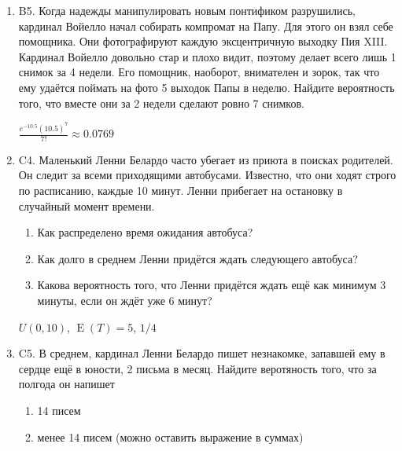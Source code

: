 \documentclass[12pt]{article}
\DeclareMathOperator{\E}{E}
\newenvironment{problem}{}{}
\newenvironment{sol}{}{} %
\begin{document}
\begin{enumerate}

\begin{problem}
\item[B5.] Когда надежды манипулировать новым понтификом разрушились, кардинал Войелло начал собирать компромат на Папу. Для этого он взял себе помощника. Они фотографируют каждую эксцентричную выходку Пия XIII. Кардинал Войелло довольно стар и плохо видит, поэтому делает всего лишь 1 снимок за 4 недели. Его помощник, наоборот, внимателен и зорок, так что ему удаётся поймать на фото 5 выходок Папы в неделю. Найдите вероятность того, что вместе они за 2 недели сделают ровно 7 снимков. 

\begin{sol}
$\frac{e^{-10.5}(10.5)^7}{7!} \approx 0.0769$
\end{sol}
\end{problem}

\begin{problem}
\item[C4.] Маленький Ленни Белардо часто убегает из приюта в поисках родителей. Он следит за всеми приходящими автобусами. Известно, что они ходят строго по расписанию, каждые 10 минут. Ленни прибегает на остановку в случайный момент времени.

\begin{enumerate}
\item Как распределено время ожидания автобуса?
\item Как долго в среднем Ленни придётся ждать следующего автобуса?
\item Какова вероятность того, что Ленни придётся ждать ещё как минимум 3 минуты, если он ждёт уже 6 минут?
\end{enumerate}

\begin{sol}
$U(0, 10)$, $\E(T) = 5$, $1/4$
\end{sol}
\end{problem}

\begin{problem}
\item[C5.] В среднем, кардинал Ленни Белардо пишет незнакомке, запавшей ему в сердце ещё в юности, 2 письма в месяц. Найдите веротяность того, что за полгода он напишет

\begin{enumerate}
\item 14 писем
\item менее 14 писем (можно оставить выражение в суммах)
\end{enumerate}


\end{problem}
\end{enumerate}
\end{document}
